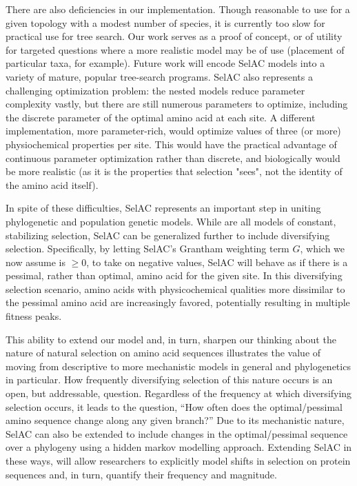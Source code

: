 \documentclass[12pt,letterpaper,fleqn]{article}
\newcommand{\PC}{physicochemical\xspace}
\newcommand{\selac}{SelAC\xspace}
\begin{document}
There are also deficiencies in our implementation.
Though reasonable to use for a given topology with a modest number of species, it is currently too slow for practical use for tree search.
Our work serves as a proof of concept, or of utility for targeted questions where a more realistic model may be of use (placement of particular taxa, for example).
Future work will encode \selac models into a variety of mature, popular tree-search programs.
\selac also represents a challenging optimization problem: the nested models reduce parameter complexity vastly, but there are still numerous parameters to optimize, including the discrete parameter of the optimal amino acid at each site.
A different implementation, more parameter-rich, would optimize values of three (or more) physiochemical properties per site.
This would have the practical advantage of continuous parameter optimization rather than discrete, and biologically would be more realistic (as it is the properties that selection "sees", not the identity of the amino acid itself).

In spite of these difficulties, \selac represents an important step in uniting phylogenetic and population genetic models.
While \citet{KoshiEtAl1999,DimmicEtAl2000,KoshiAndGoldstein2001,RobinsonEtAl2003,LartillotAndPhilippe2004,ThorneEtAl2012,RodrigueAndLartillot2014} are all models of constant, stabilizing selection, \selac can be generalized further to include diversifying selection.
Specifically, by letting \selac's Grantham weighting term $G$, which we now assume is $\ge 0$,  to take on negative values, \selac will behave as if there is a pessimal, rather than optimal, amino acid for the given site.
In this diversifying selection scenario, amino acids with \PC qualities more dissimilar to the pessimal amino acid are increasingly favored, potentially resulting in multiple fitness peaks.

This ability to extend our model and, in turn, sharpen our thinking about the nature of natural selection on amino acid sequences illustrates the value of moving from descriptive to more mechanistic models in general and phylogenetics in particular.
How frequently diversifying selection of this nature occurs is an open, but addressable, question.
Regardless of the frequency at which diversifying selection occurs, it leads to the question, ``How often does the optimal/pessimal amino sequence change along any given branch?''
Due to its mechanistic nature, \selac can also be extended to include changes in the optimal/pessimal sequence over a  phylogeny using a hidden markov modelling approach.
Extending \selac in these ways, will allow researchers to explicitly model shifts in selection on protein sequences and, in turn, quantify their frequency and magnitude.
\end{document}
